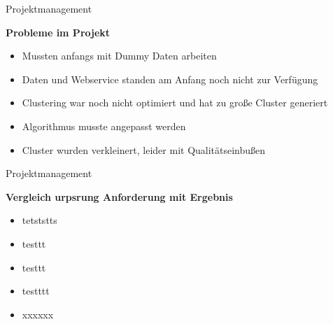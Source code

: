 \documentclass[compress,t]{beamer}
\begin{document}
\begin{frame}{Projektmanagement}

    \textbf{Probleme im Projekt}
     \begin{itemize}
          \item Mussten anfangs mit Dummy Daten arbeiten
          \item Daten und Webservice standen am Anfang noch nicht zur Verfügung
          \item Clustering war noch nicht optimiert und hat zu große Cluster generiert
          \item Algorithmus musste angepasst werden
          \item Cluster wurden verkleinert, leider mit Qualitätseinbußen
    \end{itemize}

\end{frame}
\begin{frame}{Projektmanagement}

    \textbf{Vergleich urpsrung Anforderung mit Ergebnis}
     \begin{itemize}
          \item tetststts
          \item testtt
          \item testtt
          \item testttt
          \item xxxxxx
    \end{itemize}

\end{frame}
\end{document}

